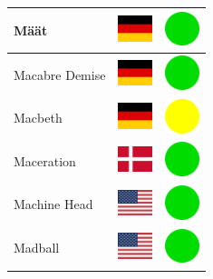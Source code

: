 \documentclass[12pt, a4paper, twoside]{report}
\begin{document}
\begin{center}
\begin{longtable}{|p{5cm}|p{2cm}|p{2cm}|}
 Määt                                                       & \includegraphics[width=1cm]{../4x3/de} &   \includegraphics[width=1cm]{../likes/y} \\ \hline
 Macabre Demise                                             & \includegraphics[width=1cm]{../4x3/de} &   \includegraphics[width=1cm]{../likes/y} \\ \hline
 Macbeth                                                    & \includegraphics[width=1cm]{../4x3/de} &   \includegraphics[width=1cm]{../likes/m} \\ \hline
 Maceration                                                 & \includegraphics[width=1cm]{../4x3/dk} &   \includegraphics[width=1cm]{../likes/y} \\ \hline
 Machine Head                                               & \includegraphics[width=1cm]{../4x3/us} &   \includegraphics[width=1cm]{../likes/y} \\ \hline
 Madball                                                    & \includegraphics[width=1cm]{../4x3/us} &   \includegraphics[width=1cm]{../likes/y} \\ \hline

\end{longtable}
\end{center}
\end{document}
